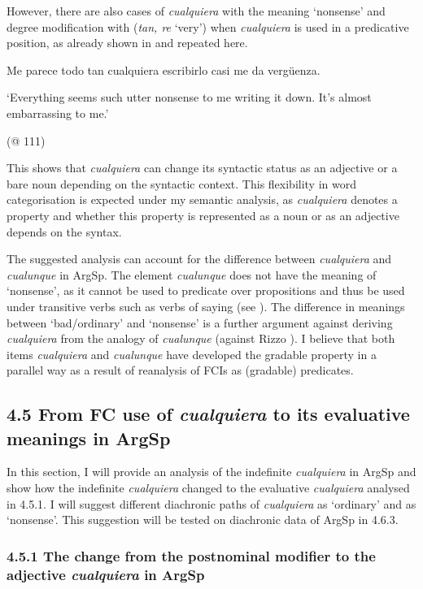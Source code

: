 \documentclass[output=paper]{langscibook}
\begin{document}
However, there are also cases of \textit{cualquiera} with the meaning ‘nonsense’ and degree modification with (\textit{tan, re} ‘very’) when \textit{cualquiera} is used in a predicative position, as already shown in  and repeated here.

    Me parece todo tan cualquiera escribirlo casi me da vergüenza.

‘Everything seems such utter nonsense to me writing it down. It’s almost embarrassing to me.’

(@ 111)

This shows that \textit{cualquiera} can change its syntactic status as an adjective or a bare noun depending on the syntactic context. This flexibility in word categorisation is expected under my semantic analysis, as \textit{cualquiera} denotes a property and whether this property is represented as a noun or as an adjective depends on the syntax.

  The suggested analysis can account for the difference between \textit{cualquiera} and \textit{cualunque} in ArgSp. The element \textit{cualunque} does not have the meaning of ‘nonsense’, as it cannot be used to predicate over propositions and thus be used under transitive verbs such as verbs of saying (see ). The difference in meanings between ‘bad/ordinary’ and ‘nonsense’ is a further argument against deriving \textit{cualquiera} from the analogy of \textit{cualunque} (against Rizzo \citealt{Salierno2013}). I believe that both items \textit{cualquiera} and \textit{cualunque} have developed the gradable property in a parallel way as a result of reanalysis of FCIs as (gradable) predicates. 

\subsection{\textbf{4.5 }\textbf{From }\textbf{FC} \textbf{use} \textbf{of} \textbf{\textit{cualquiera}} \textbf{to} \textbf{its} \textbf{evaluative} \textbf{meanings} \textbf{in} \textbf{Arg}\textbf{Sp}}

In this section, I will provide an analysis of the indefinite \textit{cualquiera} in ArgSp and show how the indefinite \textit{cualquiera} changed to the evaluative \textit{cualquiera} analysed in 4.5.1. I will suggest different diachronic paths of \textit{cualquiera} as ‘ordinary’ and as ‘nonsense’. This suggestion will be tested on diachronic data of ArgSp in 4.6.3.

\subsubsection{\textbf{4.5.1} \textbf{The} \textbf{change} \textbf{from} \textbf{the} \textbf{postnominal} \textbf{modifier} \textbf{to} \textbf{the} \textbf{adjective} \textbf{\textit{cualquiera}} \textbf{in} \textbf{ArgSp}}
\end{document}
